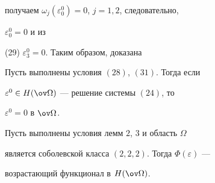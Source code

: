получаем $\omega_j(\varepsilon^0_0)=0$, $j=1,2$, следовательно, 


$\varepsilon^0_0=0$ и из 


(29) $\varepsilon^0_3=0$. Таким образом, доказана 


 


\begin{lem} 


Пусть выполнены условия $(28)$, $(31)$. Тогда если 


$\varepsilon^0\in H(\ov\Omega)$ --- решение системы $(24)$, то 


$\varepsilon^0=0$ в $\ov\Omega$. 


\end{lem} 


 


\begin{thm} 


Пусть выполнены условия лемм $2$, $3$ и область $\Omega$ 


является соболевской класса $(2,2,2)$. Тогда $\Phi(\varepsilon)$ --- 


возрастающий функционал в $H(\ov\Omega)$. 


\end{thm} 


 


